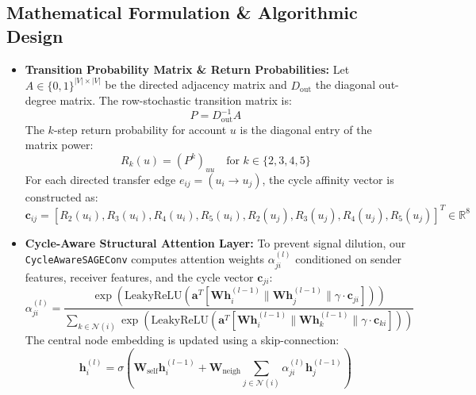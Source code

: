 \documentclass[11pt, a4paper]{article}
\begin{document}
\subsection{Mathematical Formulation \& Algorithmic Design}
\begin{itemize}[noitemsep, topsep=2pt]
    \item \textbf{Transition Probability Matrix \& Return Probabilities:}
    Let $A \in \{0, 1\}^{|V| \times |V|}$ be the directed adjacency matrix and $D_{\text{out}}$ the diagonal out-degree matrix. The row-stochastic transition matrix is:
    \begin{equation}
        P = D_{\text{out}}^{-1} A
    \end{equation}
    The $k$-step return probability for account $u$ is the diagonal entry of the matrix power:
    \begin{equation}
        R_k(u) = (P^k)_{uu} \quad \text{for } k \in \{2, 3, 4, 5\}
    \end{equation}
    For each directed transfer edge $e_{ij} = (u_i \to u_j)$, the cycle affinity vector is constructed as:
    \begin{equation}
        \mathbf{c}_{ij} = \left[ R_2(u_i), R_3(u_i), R_4(u_i), R_5(u_i), R_2(u_j), R_3(u_j), R_4(u_j), R_5(u_j) \right]^T \in \mathbb{R}^8
    \end{equation}
    \item \textbf{Cycle-Aware Structural Attention Layer:}
    To prevent signal dilution, our \texttt{CycleAwareSAGEConv} computes attention weights $\alpha_{ji}^{(l)}$ conditioned on sender features, receiver features, and the cycle vector $\mathbf{c}_{ji}$:
    \begin{equation}
        \alpha_{ji}^{(l)} = \frac{\exp\left( \text{LeakyReLU}\left( \mathbf{a}^T \left[ \mathbf{W}\mathbf{h}_i^{(l-1)} \parallel \mathbf{W}\mathbf{h}_j^{(l-1)} \parallel \gamma \cdot \mathbf{c}_{ji} \right] \right) \right)}{\sum_{k \in \mathcal{N}(i)} \exp\left( \text{LeakyReLU}\left( \mathbf{a}^T \left[ \mathbf{W}\mathbf{h}_i^{(l-1)} \parallel \mathbf{W}\mathbf{h}_k^{(l-1)} \parallel \gamma \cdot \mathbf{c}_{ki} \right] \right) \right)}
    \end{equation}
    The central node embedding is updated using a skip-connection:
    \begin{equation}
        \mathbf{h}_i^{(l)} = \sigma \left( \mathbf{W}_{\text{self}} \mathbf{h}_i^{(l-1)} + \mathbf{W}_{\text{neigh}} \sum_{j \in \mathcal{N}(i)} \alpha_{ji}^{(l)} \mathbf{h}_j^{(l-1)} \right)
    \end{equation}

\end{itemize}
\end{document}
